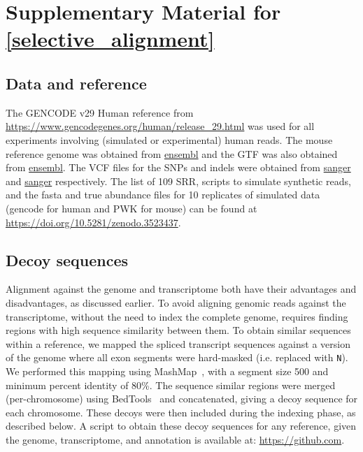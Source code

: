 
\chapter{Supplementary Material for \cref{selective_alignment}} %
\label{appendix-selal}

\section{Data and reference}
\label{subsec:meth_accessions}

The GENCODE v29 Human reference from
\url{https://www.gencodegenes.org/human/release_29.html} was used for all
experiments involving (simulated or experimental) human reads. The mouse
reference genome was obtained from
\href{ftp://ftp.ensembl.org/pub/release-91/fasta/mus_musculus/dna/Mus_musculus.GRCm38.dna.toplevel.fa.gz}
{ensembl}
and the GTF was also obtained from
\href{ftp://ftp.ensembl.org/pub/release-91/gtf/mus_musculus/Mus_musculus.GRCm38.91.gtf.gz}
{ensembl}.
The VCF files for the SNPs and indels were obtained from
\href{ftp://ftp-mouse.sanger.ac.uk/REL-1410-SNPs_Indels/mgp.v4.snps.dbSNP.vcf.gz}
{sanger}
and
\href{ftp://ftp-mouse.sanger.ac.uk/REL-1410-SNPs_Indels/mgp.v4.indels.dbSNP.vcf.gz}
{sanger}
respectively. The list of 109 SRR, scripts to simulate synthetic reads, and the fasta
and true abundance files for 10 replicates of simulated data (gencode for human
and PWK for mouse) can be found at
\url{https://doi.org/10.5281/zenodo.3523437}.

\section{Decoy sequences}
\label{subsec:meth_decoy}

Alignment against the genome and transcriptome both have their advantages and
disadvantages, as discussed earlier. To avoid aligning genomic reads against
the transcriptome, without the need to index the complete genome, requires
finding regions with high sequence similarity between them. To obtain similar
sequences within a reference, we mapped the spliced transcript sequences against
a version of the genome where all exon segments were hard-masked (i.e.\@
replaced with \texttt{N}). We performed this mapping using
MashMap~\citep{jain2018fast}, with a segment size 500 and minimum percent
identity of 80\%. The sequence similar regions were merged (per-chromosome)
using BedTools~\citep{quinlan2010bedtools} and concatenated, giving a decoy
sequence for each chromosome. These decoys were then included during the
\salmon indexing phase, as described below. A script to obtain these decoy
sequences for any reference, given the genome, transcriptome, and annotation
is available at: \href{https://github.com/COMBINE-lab/SalmonTools/blob/master/scripts/generateDecoyTranscriptome.sh}{
https://github.com}.

